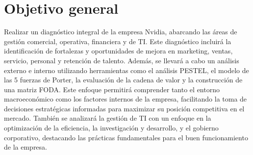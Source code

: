\documentclass{article}
\newenvironment{objetivoGeneral}{\section{Objetivo general}}{}
\begin{document}
\newpage
\begin{objetivoGeneral}
  \vspace{-0.7cm}
  Realizar un diagnóstico integral de la empresa Nvidia, abarcando las áreas de gestión comercial, operativa, financiera y de TI. Este diagnóstico incluirá la identificación de fortalezas y oportunidades de mejora en marketing, ventas, servicio, personal y retención de talento. Además, se llevará a cabo un análisis externo e interno utilizando herramientas como el análisis PESTEL, el modelo de las 5 fuerzas de Porter, la evaluación de la cadena de valor y la construcción de una matriz FODA. Este enfoque permitirá comprender tanto el entorno macroeconómico como los factores internos de la empresa, facilitando la toma de decisiones estratégicas informadas para maximizar su posición competitiva en el mercado. También se analizará la gestión de TI con un enfoque en la optimización de la eficiencia, la investigación y desarrollo, y el gobierno corporativo, destacando las prácticas fundamentales para el buen funcionamiento de la empresa.
  \vspace{-0.7cm}

\end{objetivoGeneral}
\end{document}

